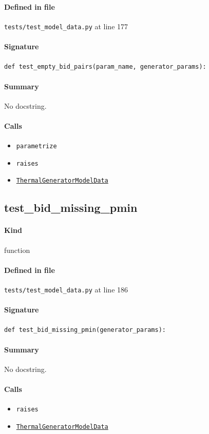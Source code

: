 \documentclass[11pt]{report}
\begin{document}
\paragraph{Defined in file} \texttt{tests/test\_model\_data.py} at line 177
\paragraph{Signature} \texttt{def test\_empty\_bid\_pairs(param\_name, generator\_params):}
\paragraph{Summary} No docstring.
\paragraph{Calls}
\begin{itemize}[leftmargin=*]
  \item \texttt{parametrize}
  \item \texttt{raises}
  \item \hyperref[def:model_data.py:ThermalGeneratorModelData:L185]{\texttt{ThermalGeneratorModelData}}
\end{itemize}
\subsection{test\_bid\_missing\_pmin}
\label{def:tests-test_model_data.py:test_bid_missing_pmin:L186}
\paragraph{Kind} function
\paragraph{Defined in file} \texttt{tests/test\_model\_data.py} at line 186
\paragraph{Signature} \texttt{def test\_bid\_missing\_pmin(generator\_params):}
\paragraph{Summary} No docstring.
\paragraph{Calls}
\begin{itemize}[leftmargin=*]
  \item \texttt{raises}
  \item \hyperref[def:model_data.py:ThermalGeneratorModelData:L185]{\texttt{ThermalGeneratorModelData}}
\end{itemize}
\end{document}
